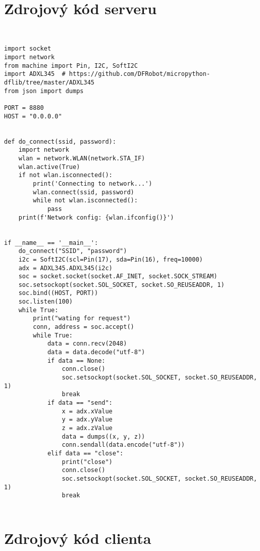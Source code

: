 \documentclass[12pt]{report}			%
\begin{document}
    \begin{appendices}
	\chapter{Zdrojový kód serveru}
	
\begin{lstlisting}[title={Program server.py}, caption={server.py},  label={lst:server}]


import socket
import network
from machine import Pin, I2C, SoftI2C
import ADXL345  # https://github.com/DFRobot/micropython-dflib/tree/master/ADXL345
from json import dumps

PORT = 8880
HOST = "0.0.0.0"


def do_connect(ssid, password):
    import network
    wlan = network.WLAN(network.STA_IF)
    wlan.active(True)
    if not wlan.isconnected():
        print('Connecting to network...')
        wlan.connect(ssid, password)
        while not wlan.isconnected():
            pass
    print(f'Network config: {wlan.ifconfig()}')


if __name__ == '__main__':
    do_connect("SSID", "password")
    i2c = SoftI2C(scl=Pin(17), sda=Pin(16), freq=10000)
    adx = ADXL345.ADXL345(i2c)
    soc = socket.socket(socket.AF_INET, socket.SOCK_STREAM)
    soc.setsockopt(socket.SOL_SOCKET, socket.SO_REUSEADDR, 1)
    soc.bind((HOST, PORT))
    soc.listen(100)
    while True:
        print("wating for request")
        conn, address = soc.accept()
        while True:
            data = conn.recv(2048)
            data = data.decode("utf-8")
            if data == None:
                conn.close()
                soc.setsockopt(socket.SOL_SOCKET, socket.SO_REUSEADDR, 1)
                break
            if data == "send":
                x = adx.xValue
                y = adx.yValue
                z = adx.zValue
                data = dumps((x, y, z))
                conn.sendall(data.encode("utf-8"))
            elif data == "close":
                print("close")
                conn.close()
                soc.setsockopt(socket.SOL_SOCKET, socket.SO_REUSEADDR, 1)
                break


\end{lstlisting}

	\chapter{Zdrojový kód clienta}

\begin{lstlisting}[title={Program client.py}, caption={client.py},  label={lst:client}]


\end{lstlisting}
\end{appendices}
\end{document}
